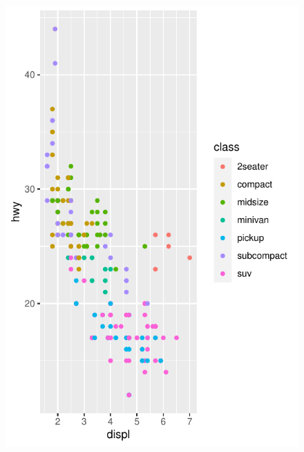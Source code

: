 \documentclass{article}
\begin{document}
\begin{figure}[H]
\centering
\includegraphics[width=1\textwidth]{../figures/scatter plot.pdf}
\caption{\protect{}}
\end{figure}
\clearpage
\end{document}
